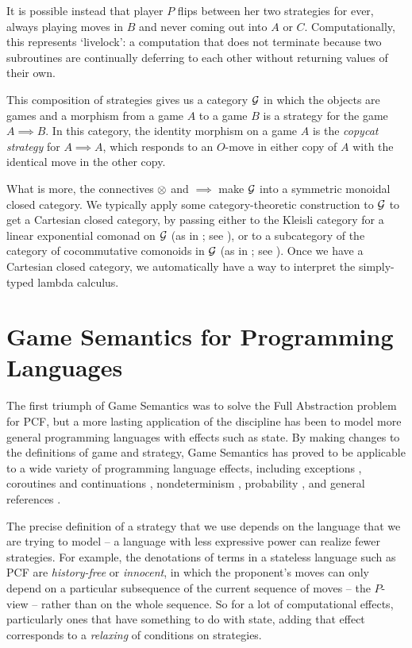 It is possible instead that player $P$ flips between her two strategies for ever, always playing moves in $B$ and never coming out into $A$ or $C$.  
Computationally, this represents `livelock': a computation that does not terminate because two subroutines are continually deferring to each other without returning values of their own.

This composition of strategies gives us a category $\mathcal G$ in which the objects are games and a morphism from a game $A$ to a game $B$ is a strategy for the game $A\implies B$.  
In this category, the identity morphism on a game $A$ is the \emph{copycat strategy} for $A\implies A$, which responds to an $O$-move in either copy of $A$ with the identical move in the other copy.

What is more, the connectives $\otimes$ and $\implies$ make $\mathcal G$ into a symmetric monoidal closed category.  
We typically apply some category-theoretic construction to $\mathcal G$ to get a Cartesian closed category, by passing either to the Kleisli category for a linear exponential comonad on $\mathcal G$ (as in \cite{ajmPcf}; see \cite{SchalkWhatIs}), or to a subcategory of the category of cocommutative comonoids in $\mathcal G$ (as in \cite{hoPcf,SamsonGuyIAActive}; see \cite[.2]{RusssThesis}).
Once we have a Cartesian closed category, we automatically have a way to interpret the simply-typed lambda calculus.

\section{Game Semantics for Programming Languages}

The first triumph of Game Semantics was to solve the Full Abstraction problem for PCF, but a more lasting application of the discipline has been to model more general programming languages with effects such as state.
By making changes to the definitions of game and strategy, Game Semantics has proved to be applicable to a wide variety of programming language effects, including exceptions \cite{LLi}, coroutines and continuations \cite{FunctionalProgramsAsCoroutines}, nondeterminism \cite{mcCHFiniteND}, probability \cite{DanosHarmer}, and general references \cite{HondaMcCusker}.

The precise definition of a strategy that we use depends on the language that we are trying to model -- a language with less expressive power can realize fewer strategies.  
For example, the denotations of terms in a stateless language such as PCF are \emph{history-free} or \emph{innocent}, in which the proponent's moves can only depend on a particular subsequence of the current sequence of moves -- the $P$-view -- rather than on the whole sequence.
So for a lot of computational effects, particularly ones that have something to do with state, adding that effect corresponds to a \emph{relaxing} of conditions on strategies.

